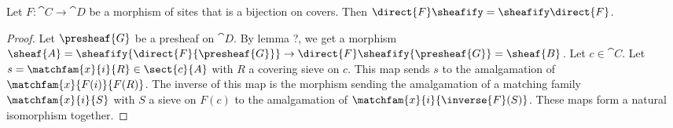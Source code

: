 \begin{lemma}
Let $F: \cat{C} \rightarrow \cat{D}$ be a morphism of sites that is a bijection on covers.
Then $\direct{F}\sheafify = \sheafify \direct{F}$.
\end{lemma}
\begin{proof}
Let $\presheaf{G}$ be a presheaf on $\cat{D}$.
By lemma ?, we get a morphism 
$\sheaf{A} = \sheafify{\direct{F}{\presheaf{G}}} \rightarrow \direct{F}\sheafify{\presheaf{G}} = \sheaf{B}$.
Let $c\in \cat{C}$.
Let $s = \matchfam{x}{i}{R} \in \sect{c}{A}$ with $R$ a covering sieve on $c$.
This map sends $s$ to the amalgamation of $\matchfam{x}{F(i)}{F(R)}$.
The inverse of this map is the morphism sending the amalgamation of a matching family $\matchfam{x}{i}{S}$ with $S$ a sieve on $F(c)$
to the amalgamation of $\matchfam{x}{i}{\inverse{F}(S)}$.
These maps form a natural isomorphism together.
\end{proof}